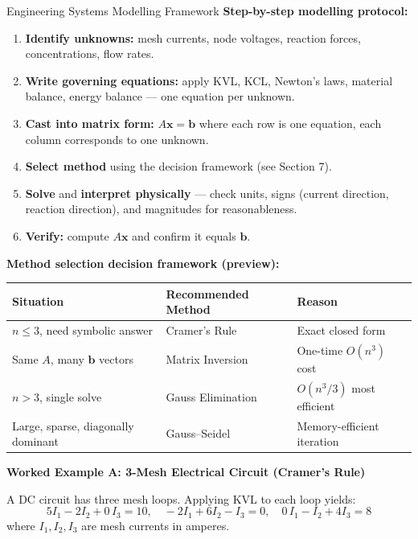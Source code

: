 \documentclass[12pt,a4paper]{article}
\begin{document}
\begin{infobox}{Engineering Systems Modelling Framework}
\textbf{Step-by-step modelling protocol:}
\begin{enumerate}[noitemsep]
  \item \textbf{Identify unknowns:} mesh currents, node voltages, reaction forces, concentrations, flow rates.
  \item \textbf{Write governing equations:} apply KVL, KCL, Newton's laws, material balance, energy balance --- one equation per unknown.
  \item \textbf{Cast into matrix form:} \(A\mathbf{x} = \mathbf{b}\) where each row is one equation, each column corresponds to one unknown.
  \item \textbf{Select method} using the decision framework (see Section 7).
  \item \textbf{Solve} and \textbf{interpret physically} --- check units, signs (current direction, reaction direction), and magnitudes for reasonableness.
  \item \textbf{Verify:} compute \(A\mathbf{x}\) and confirm it equals \(\mathbf{b}\).
\end{enumerate}

\textbf{Method selection decision framework (preview):}
\begin{center}
\begin{tabular}{@{}lll@{}}
\toprule
\textbf{Situation} & \textbf{Recommended Method} & \textbf{Reason} \\
\midrule
\(n \leq 3\), need symbolic answer & Cramer's Rule & Exact closed form \\
Same \(A\), many \(\mathbf{b}\) vectors & Matrix Inversion & One-time \(O(n^3)\) cost \\
\(n > 3\), single solve & Gauss Elimination & \(O(n^3/3)\) most efficient \\
Large, sparse, diagonally dominant & Gauss--Seidel & Memory-efficient iteration \\
\bottomrule
\end{tabular}
\end{center}
\end{infobox}

\textbf{Worked Example A: 3-Mesh Electrical Circuit (Cramer's Rule)}

A DC circuit has three mesh loops. Applying KVL to each loop yields:
\[
5I_1 - 2I_2 + 0\,I_3 = 10, \quad -2I_1 + 6I_2 - I_3 = 0, \quad 0\,I_1 - I_2 + 4I_3 = 8
\]
where \(I_1, I_2, I_3\) are mesh currents in amperes.
\end{document}
